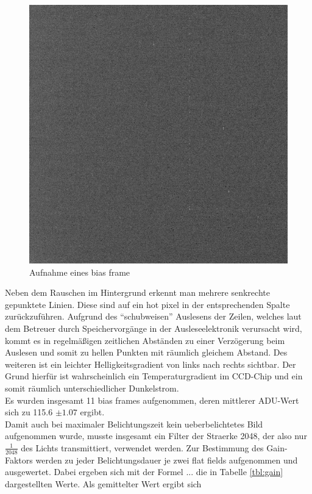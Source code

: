 \begin{figure}[h!]
        \includegraphics[width=.9\textwidth]{beiers_01.png}
\caption{ Aufnahme eines bias frame }
\label{fig:bias}
\end{figure}
Neben dem Rauschen im Hintergrund erkennt man mehrere senkrechte gepunktete Linien. Diese sind auf ein hot pixel in der entsprechenden Spalte zurückzuführen. Aufgrund des \enquote{schubweisen} Auslesens der Zeilen, welches  laut dem Betreuer durch Speichervorgänge in der Ausleseelektronik verursacht wird, kommt es in regelmäßigen zeitlichen Abständen zu einer Verzögerung beim Auslesen und somit zu hellen Punkten mit räumlich gleichem Abstand. Des weiteren ist ein leichter Helligkeitsgradient von links nach rechts sichtbar. Der Grund hierfür ist wahrscheinlich ein Temperaturgradient im CCD-Chip und ein somit räumlich unterschiedlicher Dunkelstrom. \\
Es wurden insgesamt 11 bias frames aufgenommen, deren mittlerer ADU-Wert sich zu 115.6 $ \pm 1.07$ ergibt. \\
Damit auch bei maximaler Belichtungszeit kein ueberbelichtetes Bild aufgenommen wurde, musste insgesamt ein Filter der Straerke 2048, der also nur $\frac{1}{2048}$ des Lichts transmittiert, verwendet werden. 
Zur Bestimmung des Gain-Faktors werden zu jeder Belichtungsdauer je zwei flat fields aufgenommen und ausgewertet. Dabei ergeben sich mit der Formel ... die in Tabelle \ref{tbl:gain} dargestellten Werte. Als gemittelter Wert ergibt sich 
